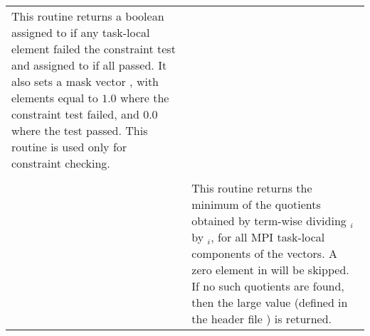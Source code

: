 \begin{xtabular}{|p{\coloned}|p{\coltwod}|}
This routine returns a boolean assigned to  if any
task-local element failed the constraint test and assigned to
 if all passed.  It also sets a mask vector , with
elements equal to $1.0$ where the constraint test failed, and $0.0$
where the test passed.  This routine is used only for constraint
checking.
\\[2mm]
 &  \\
& This routine returns the minimum of the quotients obtained
by term-wise dividing $_i$ by $_i$, for all MPI
task-local components of the vectors.  A zero element in 
will be skipped. If no such quotients are found, then the large value
 (defined in the header file )
is returned.
\\
\end{xtabular}
